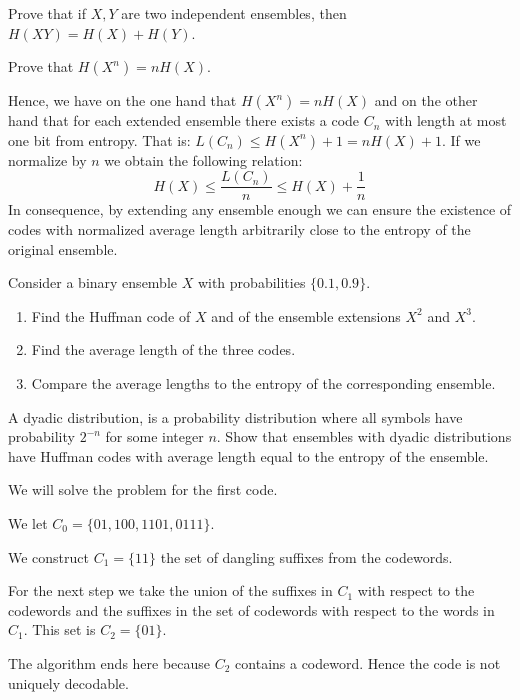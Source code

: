 \begin{exercise}
Prove that if $X,Y$ are two independent ensembles, then $H(XY)=H(X)+H(Y)$.
\end{exercise}
\begin{exercise}
Prove that $H(X^n)=nH(X)$.
\end{exercise}
Hence, we have on the one hand that $H(X^n)=nH(X)$ and on the other hand that for each extended ensemble there exists a code $C_n$ with length at most one bit from entropy. That is: $L(C_n)\leq H(X^n)+1=nH(X)+1$. If we normalize by $n$ we obtain the following relation:
\begin{equation}
H(X)\leq \frac{L(C_n)}{n}\leq H(X)+\frac{1}{n}
\end{equation}
In consequence, by extending any ensemble enough we can ensure the existence of codes with normalized average length arbitrarily close to the entropy of the original ensemble.
\begin{exercise}
Consider a binary ensemble $X$ with probabilities $\{0.1,0.9\}$. 
\begin{enumerate}
\item Find the Huffman code of $X$ and of the ensemble extensions $X^2$ and $X^3$. 
\item Find the average length of the three codes.
\item Compare the average lengths to the entropy of the corresponding ensemble.
\end{enumerate}
\end{exercise}
\begin{exercise}
A dyadic distribution, is a probability distribution where all symbols have probability $2^{-n}$ for some integer $n$. Show that ensembles with dyadic distributions have Huffman codes with average length equal to the entropy of the ensemble.
\end{exercise}
\begin{solution}
We will solve the problem for the first code.

\noindent We let $C_0=\{01,100,1101,0111\}$.

\noindent We construct $C_1=\{11\}$ the set of dangling suffixes from the codewords.

\noindent For the next step we take the union of the suffixes in $C_1$ with respect to the codewords and the suffixes in the set of codewords with respect to the words in $C_1$. This set is $C_2=\{01\}$. 

\noindent The algorithm ends here because $C_2$ contains a codeword. Hence the code is not uniquely decodable.
\end{solution}
